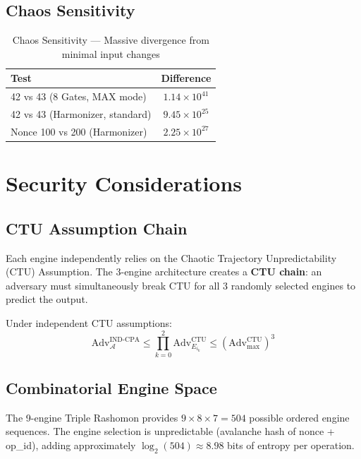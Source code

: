 \documentclass[11pt,a4paper]{article}
\begin{document}
\subsection{Chaos Sensitivity}

\begin{table}[h]
\centering
\begin{tabular}{|l|c|}
\hline
\textbf{Test} & \textbf{Difference} \\
\hline
42 vs 43 (8 Gates, MAX mode) & $1.14 \times 10^{41}$ \\
42 vs 43 (Harmonizer, standard) & $9.45 \times 10^{25}$ \\
Nonce 100 vs 200 (Harmonizer) & $2.25 \times 10^{27}$ \\
\hline
\end{tabular}
\caption{Chaos Sensitivity — Massive divergence from minimal input changes}
\end{table}

\section{Security Considerations}

\subsection{CTU Assumption Chain}

Each engine independently relies on the Chaotic Trajectory Unpredictability (CTU) Assumption. The 3-engine architecture creates a \textbf{CTU chain}: an adversary must simultaneously break CTU for all 3 randomly selected engines to predict the output.

Under independent CTU assumptions:
\[
\text{Adv}^{\text{IND-CPA}}_{\mathcal{A}} \leq \prod_{k=0}^{2} \text{Adv}^{\text{CTU}}_{E_{i_k}} \leq (\text{Adv}^{\text{CTU}}_{\max})^3
\]

\subsection{Combinatorial Engine Space}

The 9-engine Triple Rashomon provides $9 \times 8 \times 7 = 504$ possible ordered engine sequences. The engine selection is unpredictable (avalanche hash of nonce + op\_id), adding approximately $\log_2(504) \approx 8.98$ bits of entropy per operation.
\end{document}
